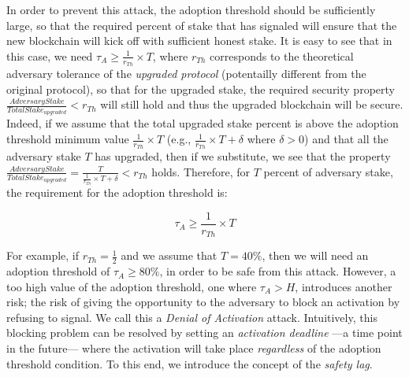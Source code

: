 In order to prevent this attack, the adoption threshold should be sufficiently 
large, so that the required percent of stake that has signaled will ensure that 
the new blockchain will kick off with sufficient honest stake. It is easy to 
see that in this case, we need $\tau_A \geq \frac{1}{r_{Th}} \times T$, where 
$r_{Th}$ corresponds to the theoretical adversary tolerance of the 
\emph{upgraded protocol} (potentailly different from the original protocol),  
so that for the upgraded stake, the required security property
$\frac{AdversaryStake}{TotalStake_{upgraded}} < r_{Th}$ will still hold and thus the upgraded blockchain will be secure. Indeed, if we assume that the total upgraded stake percent is above the adoption threshold minimum value $\frac{1}{r_{Th}} \times T$ (e.g., $\frac{1}{r_{Th}} \times T + \delta$ where $\delta > 0$) and that all the adversary stake $T$ has upgraded, then if we substitute, we see that the property $\frac{AdversaryStake}{TotalStake_{upgraded}} = \frac{T}{\frac{1}{r_{Th}} \times T + \delta} < r_{Th}$ holds. Therefore, for $T$ percent of adversary stake, the requirement for the adoption threshold is:

\begin{equation} \label{tauA}
\tau_A \geq \frac{1}{r_{Th}} \times T
\end{equation}

For example, if $r_{Th} = \frac{1}{2}$ and we assume that $T = 40\%$, then we will need an adoption threshold of $\tau_A \geq 80\% $, in order to be safe from this attack. However, a too high value of the adoption threshold, one where $\tau_A > H$, introduces another risk; the risk of  giving the opportunity to the adversary to block an activation by refusing to signal. We call this a \emph{Denial of Activation} attack. Intuitively, this blocking problem can be resolved by setting an \emph{activation deadline} ---a time point in the future--- where the activation will take place \emph{regardless} of the adoption threshold condition. To this end, we introduce the concept of the \emph{safety lag}.

